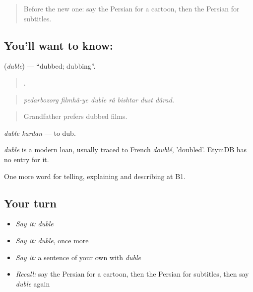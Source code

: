\label{lesson:FA-C531-duble}



\begin{quote}
Before the new one: say the Persian for a cartoon, then the Persian for subtitles.
\end{quote}

\subsection*{You'll want to know: }
\textbf{} (\emph{duble}) — \textquotedblleft{}dubbed; dubbing\textquotedblright{}.

\begin{quote}
      .
\end{quote}

\begin{quote}
\emph{pedarbozorg filmhâ-ye duble râ bishtar dust dârad.}
\end{quote}

\begin{quote}
Grandfather prefers dubbed films.
\end{quote}

\emph{duble kardan} — to dub.

\begin{cousinweb}
\emph{duble} is a modern loan, usually traced to French \emph{doublé}, 'doubled'. EtymDB has no entry for it.
\end{cousinweb}

\begin{grammarlens}[title={What you've built}]
One more word for telling, explaining and describing at B1.
\end{grammarlens}

\subsection*{Your turn}
\begin{itemize}
\raggedright
  \item \emph{Say it:} \emph{duble}
  \item \emph{Say it:} \emph{duble}, once more
  \item \emph{Say it:} a sentence of your own with \emph{duble}
  \item \emph{Recall:} say the Persian for a cartoon, then the Persian for subtitles, then say \emph{duble} again
\end{itemize}


